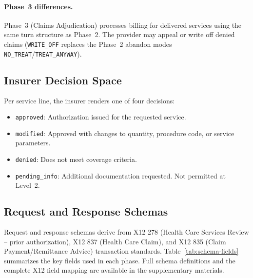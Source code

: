 \paragraph{Phase~3 differences.}
Phase~3 (Claims Adjudication) processes billing for delivered services using the same turn structure as Phase~2. The provider may appeal or write off denied claims (\texttt{WRITE\_OFF} replaces the Phase~2 abandon modes \texttt{NO\_TREAT}/\texttt{TREAT\_ANYWAY}). 
\subsection{Insurer Decision Space}

Per service line, the insurer renders one of four decisions:
\begin{itemize}
    \item \texttt{approved}: Authorization issued for the requested service.
    \item \texttt{modified}: Approved with changes to quantity, procedure code, or service parameters.
    \item \texttt{denied}: Does not meet coverage criteria.
    \item \texttt{pending\_info}: Additional documentation requested. Not permitted at Level~2.
\end{itemize}

\subsection{Request and Response Schemas}

Request and response schemas derive from X12 278 (Health Care Services Review -- prior authorization), X12 837 (Health Care Claim), and X12 835 (Claim Payment/Remittance Advice) transaction standards. Table~\ref{tab:schema-fields} summarizes the key fields used in each phase. Full schema definitions and the complete X12 field mapping are available in the supplementary materials.

